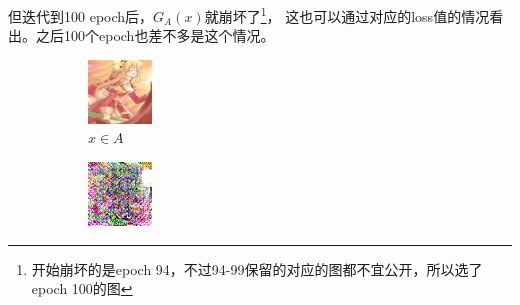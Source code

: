 \documentclass[twocolumn,11pt]{ctexart}
\begin{document}
但迭代到100 epoch后，$G_A(x)$就崩坏了\footnote{开始崩坏的是epoch 94，不过94-99保留的对应的图都不宜公开，所以选了
epoch 100的图}，
这也可以通过对应的loss值的情况看出。之后100个epoch也差不多是这个情况。

\begin{figure}[htb]
    \centering
    \begin{subfigure}[b]{0.23\linewidth}
        \includegraphics[width=\linewidth]{exp2_epoch100_real_A.png}
        \caption{$x \in A$}
      \end{subfigure}
      \begin{subfigure}[b]{0.23\linewidth}
        \includegraphics[width=\linewidth]{exp2_epoch100_fake_B.png}

\end{subfigure}
\end{figure}
\end{document}
